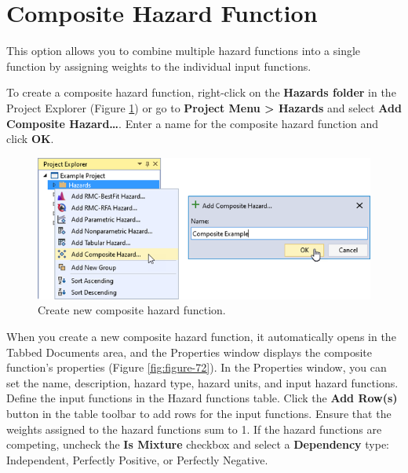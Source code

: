 \documentclass[
]{book}
\begin{document}
\hypertarget{composite-hazard-function}{%
\section{Composite Hazard Function}\label{composite-hazard-function}}

This option allows you to combine multiple hazard functions into a single function by assigning weights to the individual input functions.

To create a composite hazard function, right-click on the \textbf{Hazards folder} in the Project Explorer (Figure \ref{fig:figure-71}) or go to \textbf{Project Menu \textgreater{} Hazards} and select \textbf{Add Composite Hazard\ldots{}}. Enter a name for the composite hazard function and click \textbf{OK}.

\begin{figure}

{\centering \includegraphics{images/figure71} 

}

\caption{Create new composite hazard function.}\label{fig:figure-71}
\end{figure}

When you create a new composite hazard function, it automatically opens in the Tabbed Documents area, and the Properties window displays the composite function's properties (Figure \ref{fig:figure-72}). In the Properties window, you can set the name, description, hazard type, hazard units, and input hazard functions. Define the input functions in the Hazard functions table. Click the \textbf{Add Row(s)} button in the table toolbar to add rows for the input functions. Ensure that the weights assigned to the hazard functions sum to 1. If the hazard functions are competing, uncheck the \textbf{Is Mixture} checkbox and select a \textbf{Dependency} type: Independent, Perfectly Positive, or Perfectly Negative.
\end{document}
